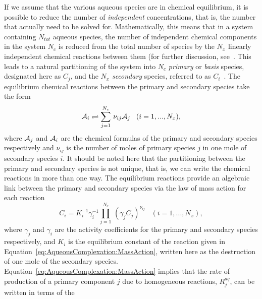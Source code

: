 If we assume that the various aqueous species are in chemical
equilibrium, it is possible to reduce the number of
\textit{independent} concentrations, that is, the number that actually
need to be solved for. Mathematically, this means that in a system
containing $N_{tot} $ aqueous species, the number of independent
chemical components in the system $N_{c} $ is reduced from the total
number of species by the $N_{x} $ linearly independent chemical
reactions between them (for further discussion,
see~\citet{hooyman_1961, aris_1965, bowen_1968, van_1970, reed_1982,
  lichtner_1985, kirkner_1988}. This leads to a natural partitioning
of the system into $N_{c} $ \textit{primary} or \textit{basis}
species, designated here as $C_{j} $, and the $N_{x} $
\textit{secondary} species, referred to as $C_{i}
$~\citep{reed_1982, lichtner_1985, kirkner_1988}. The equilibrium
chemical reactions between the primary and secondary species take the
form
%
\begin{equation}
  {\mathcal A}_{i} 
     \rightleftharpoons 
        \sum _{j=1}^{N_{c} } \, 
        \nu _{ij} {\mathcal A}_{j} \; \; \; 
        (i=1,...,N_{x} ), 
\label{eq:AqueousComplexation:EquilibriumReaction} 
\end{equation} 
%
where ${\mathcal A}_{j} $ and ${\mathcal A}_{i} $ are the
chemical formulas of the primary and secondary species respectively
and $\nu _{ij} $ is the number of moles of primary
species $j$ in one mole of secondary species $i$. 
It should be noted here that the partitioning between the primary
and secondary species is not unique, that is, we can write the
chemical reactions in more than one way. The equilibrium reactions
provide an algebraic link between the primary and secondary species
via the law of mass action for each reaction
\begin{equation}
  C_{i} 
     = K_{i}^{-1} \gamma _{i}^{-1} 
       \prod _{j=1}^{N_{c} } \, 
          ( \gamma _{j} C_{j} )^{\nu _{ij}}
     \; \; \; 
     (i=1,...,N_{x} ), 
\label{eq:AqueousComplexation:MassAction} 
\end{equation} 
%
where $\gamma _{j} $ and $\gamma _{i} $ are
the activity coefficients for the primary and secondary species
respectively, and $K_{i} $ is the equilibrium
constant of the reaction given in
Equation~\eqref{eq:AqueousComplexation:MassAction}, written here as
the destruction of one mole of the secondary
species. Equation~\eqref{eq:AqueousComplexation:MassAction} implies
that the rate of production of a primary component $j$ due to
homogeneous reactions, $R_{j}^{aq}$, can be written in terms of the
